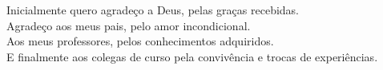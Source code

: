 
\begin{minipage}{\textwidth}
    Inicialmente quero agradeço a Deus, pelas graças recebidas. \\
    Agradeço aos meus pais, pelo amor incondicional. \\
    Aos meus professores, pelos conhecimentos adquiridos. \\
     E finalmente aos colegas de curso pela convivência e trocas de experiências.
\end{minipage}

